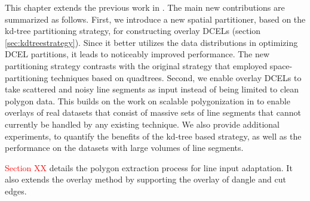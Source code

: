 This chapter extends the previous work in \cite{calderon_scalable_2023}. The main new contributions are summarized as follows. First, we introduce a new spatial partitioner, based on the kd-tree partitioning strategy, for constructing overlay  DCELs (section \ref{sec:kdtreestrategy}). Since it better utilizes the data  distributions in optimizing DCEL partitions, it leads to noticeably improved performance. The new partitioning strategy contrasts with the original strategy that employed space-partitioning techniques based on quadtrees. Second, we enable overlay DCELs to take scattered and noisy line segments as input instead of being limited to clean polygon data.  This builds on the work on scalable polygonization in \cite{abdelhafeez_ddcel_2023} to enable overlays of real datasets that consist of massive sets of line segments that cannot currently be handled by any existing technique. We also provide additional experiments, to quantify the benefits of the kd-tree based strategy, as well as the performance on the datasets with large volumes of line segments.

\textcolor{red}{Section XX} details the polygon extraction process for line input adaptation. It also extends the overlay method by supporting the overlay of dangle and cut edges.
